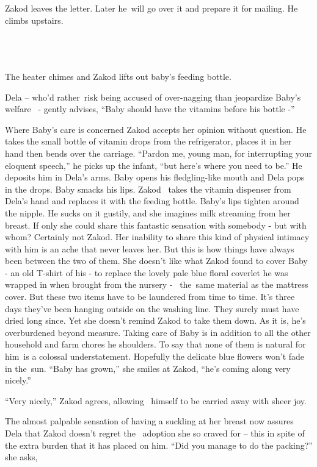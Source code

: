 \documentclass[twoside,11pt]{book}
\begin{document}
Zakod leaves the letter. Later he~will go over it and prepare it for mailing. He climbs upstairs.

~

\chapter{}

The heater chimes and Zakod lifts out baby's feeding bottle.

Dela -- who'd rather~risk being accused of over-nagging than jeopardize Baby's welfare ~- gently advises,
``Baby should have the vitamins before his bottle -''

Where Baby's care is concerned Zakod accepts her opinion without question. He takes the small bottle of vitamin drops
from the refrigerator, places it in her hand then bends over the carriage. ``Pardon me, young man, for
interrupting your eloquent speech,'' he picks up the infant, ``but here's where you need to
be.'' He deposits him in Dela's arms. Baby opens his fledgling-like mouth and Dela pops in the drops. Baby
smacks his lips. Zakod \ takes the vitamin dispenser from Dela's hand and replaces it with the feeding bottle. Baby's
lips tighten around the nipple. He sucks on it gustily, and she imagines milk streaming from her breast. If only she
could share this fantastic sensation with somebody - but with whom? Certainly not Zakod. Her inability to share this
kind of physical intimacy with him is an ache that never leaves her. But this is how things have always been between
the two of them. She doesn't like what Zakod found to cover Baby - an old T-shirt of his - to replace the lovely pale
blue floral coverlet he was wrapped in when brought from the nursery - \ the~same material as the mattress cover. But
these two items have to be laundered from time to time. It's three days they've been hanging outside on the washing
line. They surely must have dried long since. Yet she doesn't remind Zakod to take them down. As it is, he's
overburdened beyond measure. Taking care of Baby is in addition to all the other household and farm chores he
shoulders. To say that none of them is natural for him~is a colossal understatement. Hopefully the delicate blue
flowers won't fade in the~sun. ``Baby has grown,'' she smiles at Zakod, ``he's coming along very
nicely.''

``Very nicely,'' Zakod agrees, allowing \ himself to be carried away with sheer joy.

The almost palpable sensation of having a suckling at her breast now assures Dela that Zakod doesn't regret the~
adoption she so craved for -- this in spite of the extra burden that it has placed on him. ``Did you
manage to do the packing?'' she asks,
\end{document}
